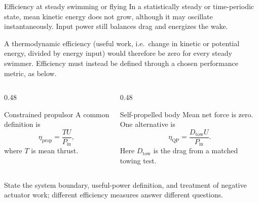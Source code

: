 \documentclass[aspectratio=169,11pt]{beamer}
\begin{document}
\begin{frame}{Efficiency at steady swimming or flying}
\small
In a statistically steady or time-periodic state, mean kinetic energy does not grow, although it may oscillate instantaneously. Input power still balances drag and energizes the wake.

{\small A thermodynamic efficiency (useful work, i.e.\ change in kinetic or potential energy, divided by energy input) would therefore be zero for every steady swimmer. Efficiency must instead be defined through a chosen performance metric, as below.}

\begin{columns}[T,onlytextwidth]
\begin{column}{0.48\textwidth}
\begin{block}{Constrained propulsor}
A common definition is
\[
  \eta_{\mathrm{prop}}=\frac{TU}{P_{\mathrm{in}}},
\]
where $T$ is mean thrust.
\end{block}
\end{column}
\begin{column}{0.48\textwidth}
\begin{block}{Self-propelled body}
Mean net force is zero. One alternative is
\[
  \eta_{\mathrm{QP}}=\frac{D_{\mathrm{tow}}U}{P_{\mathrm{in}}}.
\]
Here $D_{\mathrm{tow}}$ is the drag from a matched towing test.
\end{block}
\end{column}
\end{columns}

\begin{punchbox}
\small State the system boundary, useful-power definition, and treatment of negative actuator work; different efficiency measures answer different questions.
\end{punchbox}
\end{frame}
\end{document}
